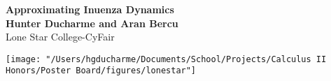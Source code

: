 \documentclass[a0, landscape, final]{a0poster}
\begin{document}


\begin{minipage}[b]{0.80\linewidth}
\begin{center}
\VeryHuge \color{BrickRed} \textbf{Approximating Inuenza Dynamics} \color{Black}\\%
\vspace{0.5em}
\huge \textbf{Hunter Ducharme and Aran Bercu}\\ %
\huge Lone Star College-CyFair\\ %
\end{center}
\vspace{4.1em}
\end{minipage}
%
\begin{comment}
\begin{minipage}[b]{0.25\linewidth}
\color{DarkSlateGray}\Large \textbf{Contact Information:}\\
Lone Star College-CyFair \\
9191 Barker Cypress Rd. \\ 
Cypress, TX 77433 \\\\
Phone: (281) 450-7154\\
Email: hgducharme@gmail.com\\
\end{minipage}
\end{comment}
%
\begin{minipage}[b]{0.19\linewidth}
\begin{flushright}
	\texttt{[image: "/Users/hgducharme/Documents/School/Projects/Calculus II Honors/Poster Board/figures/lonestar"]} 
\end{flushright}
\end{minipage}

\vspace{1cm} %
\end{document}
